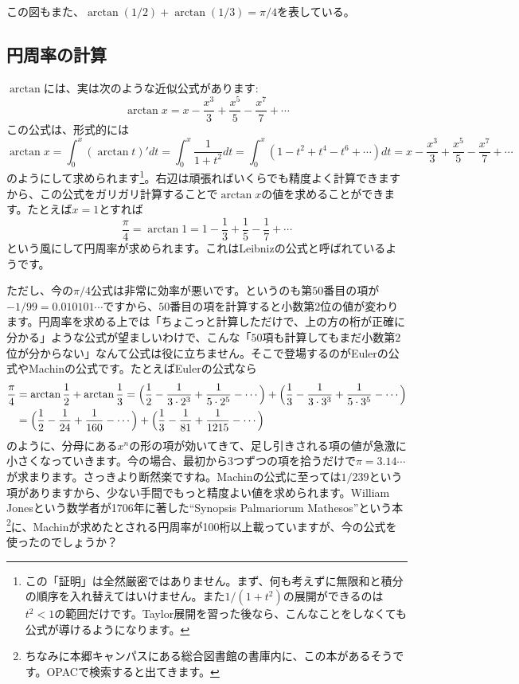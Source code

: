 この図もまた、$\arctan (1/2) + \arctan (1/3) = \pi/4$を表している。

\subsection{円周率の計算}

$\arctan$には、実は次のような近似公式があります:
\[
\arctan x = x - \frac{x^3}{3} + \frac{x^5}{5} - \frac{x^7}{7} + \cdots
\]
この公式は、形式的には
\[
\arctan x = \int_0^x (\arctan t)' dt = \int_0^x \frac{1}{1+t^2} dt = \int_0^x (1-t^2+t^4-t^6+\cdots) dt
= x - \frac{x^3}{3} + \frac{x^5}{5} - \frac{x^7}{7} + \cdots
\]
のようにして求められます\footnote{この「証明」は全然厳密ではありません。まず、何も考えずに無限和と積分の順序を入れ替えてはいけません。また$1/(1+t^2)$の展開ができるのは$t^2<1$の範囲だけです。Taylor展開を習った後なら、こんなことをしなくても公式が導けるようになります。}。右辺は頑張ればいくらでも精度よく計算できますから、この公式をガリガリ計算することで$\arctan x$の値を求めることができます。たとえば$x=1$とすれば
\[
\frac{\pi}{4} = \arctan 1 = 1 - \frac{1}{3} + \frac{1}{5} - \frac{1}{7} + \cdots
\]
という風にして円周率が求められます。これはLeibnizの公式と呼ばれているようです。

ただし、今の$\pi/4$公式は非常に効率が悪いです。というのも第$50$番目の項が$-1/99 = 0.010101\cdots$ですから、$50$番目の項を計算すると小数第$2$位の値が変わります。円周率を求める上では「ちょこっと計算しただけで、上の方の桁が正確に分かる」ような公式が望ましいわけで、こんな「$50$項も計算してもまだ小数第$2$位が分からない」なんて公式は役に立ちません。そこで登場するのがEulerの公式やMachinの公式です。たとえばEulerの公式なら
\begin{align*}
\frac{\pi}{4}
&= \arctan \frac{1}{2} + \arctan \frac{1}{3}
= \Bigl(\frac{1}{2} - \frac{1}{3\cdot 2^3} + \frac{1}{5\cdot 2^5} - \cdots\Bigr)
+ \Bigl(\frac{1}{3} - \frac{1}{3\cdot 3^3} + \frac{1}{5\cdot 3^5} - \cdots\Bigr) \\
&= \Bigl(\frac{1}{2} - \frac{1}{24} + \frac{1}{160} - \cdots\Bigr)
+ \Bigl(\frac{1}{3} - \frac{1}{81} + \frac{1}{1215} - \cdots\Bigr)
\end{align*}
のように、分母にある$x^n$の形の項が効いてきて、足し引きされる項の値が急激に小さくなっていきます。今の場合、最初から$3$つずつの項を拾うだけで$\pi=3.14\cdots$が求まります。さっきより断然楽ですね。Machinの公式に至っては$1/239$という項がありますから、少ない手間でもっと精度よい値を求められます。William Jonesという数学者が1706年に著した``Synopsis Palmariorum Mathesos''という本\footnote{ちなみに本郷キャンパスにある総合図書館の書庫内に、この本があるそうです。OPACで検索すると出てきます。}に、Machinが求めたとされる円周率が100桁以上載っていますが、今の公式を使ったのでしょうか？

